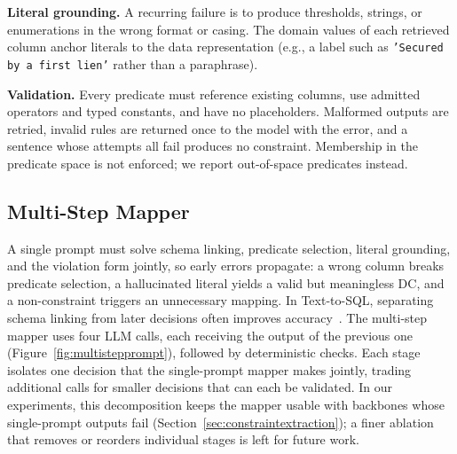 \smallskip\noindent\textbf{Literal grounding.}
A recurring failure is to produce thresholds, strings, or enumerations in the wrong format or casing. The domain values of each retrieved column anchor literals to the data representation (e.g., a label such as \texttt{'Secured by a first lien'} rather than a paraphrase).

\smallskip\noindent\textbf{Validation.}
Every predicate must reference existing columns, use admitted operators and typed constants, and have no placeholders. Malformed outputs are retried, invalid rules are returned once to the model with the error, and a sentence whose attempts all fail produces no constraint. Membership in the predicate space is not enforced; we report out-of-space predicates instead.

\subsection{Multi-Step Mapper}
\label{sec:mapper:multistep}

A single prompt must solve schema linking, predicate selection, literal grounding, and the violation form jointly, so early errors propagate: a wrong column breaks predicate selection, a hallucinated literal yields a valid but meaningless DC, and a non-constraint triggers an unnecessary mapping. In Text-to-SQL, separating schema linking from later decisions often improves accuracy~\cite{DBLP:conf/dexa/DociniAO25,redsql2025,dail2025,resdsql2023}. The multi-step mapper uses four LLM calls, each receiving the output of the previous one (Figure~\ref{fig:multistepprompt}), followed by deterministic checks. Each stage isolates one decision that the single-prompt mapper makes jointly, trading additional calls for smaller decisions that can each be validated. In our experiments, this decomposition keeps the mapper usable with backbones whose single-prompt outputs fail (Section~\ref{sec:constraintextraction}); a finer ablation that removes or reorders individual stages is left for future work.

